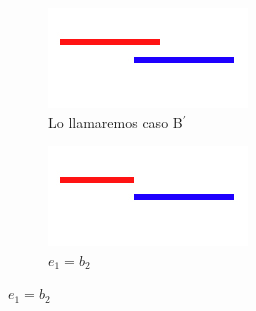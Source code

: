 \begin{itemize}
\begin{itemize}
            \begin{figure}[H]
        		\centering
				\begin{subfigure}[b]{0.25\textwidth}
                	\includegraphics[width=\textwidth]{imagenes/ej2-b.jpg}
                	\caption*{Lo llamaremos caso B$^{\prime}$}
        		\end{subfigure}%

				\begin{subfigure}[b]{0.25\textwidth}
                	\includegraphics[width=\textwidth]{imagenes/ej2-b4c.jpg}
                	\caption*{$e_{1} = b_{2}$}
        		\end{subfigure}%
			\end{figure}


\end{itemize}
\end{itemize}
